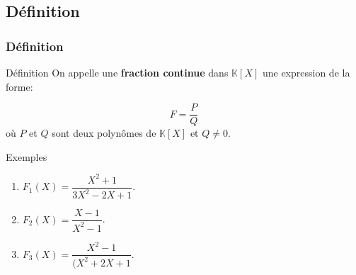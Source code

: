 \documentclass{beamer}
\newcommand{\setK}{\mathbb{K}}
\begin{document}
\subsection{Définition}
\begin{frame}[t]
  \frametitle{Définition}
\begin{block}{Définition}
  On appelle une \textbf{\alert{fraction continue}}  dans $\setK[X]$ une
  expression de la forme:

  \begin{equation}
    F  = \dfrac{P}{Q}
  \end{equation}
  où $P$ et $Q$ sont deux polynômes de $\setK[X]$ et $Q \neq 0$.
\end{block}  
\pause
\begin{block}{Exemples }
 \begin{enumerate}
   \small
   \item $F_1(X) = \dfrac{X^2 + 1}{3X^2 - 2X + 1}$.\\[4pt]
   \item $F_2(X) = \dfrac{X-1}{X^2 - 1}$.\\[4pt]
   \item $F_3(X) = \dfrac{X^2 - 1}{(X^2 + 2X + 1}$.\\[4pt]
 \end{enumerate} 
\end{block}
\end{frame}
\end{document}
